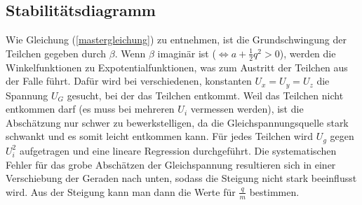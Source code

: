 \documentclass[a4paper,12pt]{article}
\begin{document}
\subsection{Stabilitätsdiagramm}
Wie Gleichung (\ref{mastergleichung}) zu entnehmen, ist die Grundschwingung der Teilchen gegeben durch $β$.
Wenn $β$ imaginär ist ($ \Leftrightarrow a + \frac12q^2 >0$), werden die Winkelfunktionen zu Expotentialfunktionen, was zum Austritt der Teilchen aus der Falle führt.
Dafür wird bei verschiedenen, konstanten $U_x = U_y = U_z$ die Spannung $U_G$ gesucht, bei der das Teilchen entkommt.
Weil das Teilchen nicht entkommen darf (es muss bei mehreren $U_i$ vermessen werden), ist die Abschätzung nur schwer zu bewerkstelligen, da die Gleichspannungsquelle stark schwankt und es somit leicht entkommen kann.
Für jedes Teilchen wird $U_g$ gegen $U_i^2$ aufgetragen und eine lineare Regression durchgeführt.
Die systematischen Fehler für das grobe Abschätzen der Gleichspannung resultieren sich in einer Verschiebung der Geraden nach unten, sodass die Steigung nicht stark beeinflusst wird.
Aus der Steigung kann man dann die Werte für $\frac{q}{m}$ bestimmen.
\end{document}
